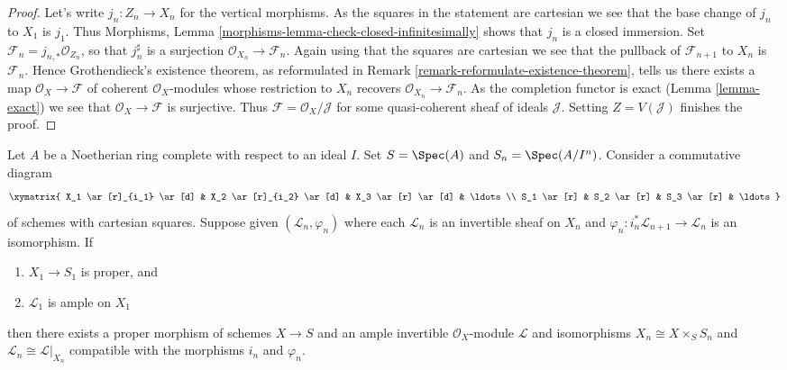 \begin{proof}
Let's write $j_n : Z_n \to X_n$ for the vertical morphisms.
As the squares in the statement are cartesian
we see that the base change of $j_n$ to $X_1$ is $j_1$.
Thus Morphisms, Lemma \ref{morphisms-lemma-check-closed-infinitesimally}
shows that $j_n$ is a closed immersion.
Set $\mathcal{F}_n = j_{n, *}\mathcal{O}_{Z_n}$, so that
$j_n^\sharp$ is a surjection $\mathcal{O}_{X_n} \to \mathcal{F}_n$.
Again using that the squares are cartesian we see that
the pullback of $\mathcal{F}_{n + 1}$ to $X_n$ is $\mathcal{F}_n$.
Hence Grothendieck's existence theorem, as reformulated in
Remark \ref{remark-reformulate-existence-theorem},
tells us there exists a map
$\mathcal{O}_X \to \mathcal{F}$
of coherent $\mathcal{O}_X$-modules whose restriction to
$X_n$ recovers $\mathcal{O}_{X_n} \to \mathcal{F}_n$.
As the completion functor is exact (Lemma \ref{lemma-exact})
we see that $\mathcal{O}_X \to \mathcal{F}$
is surjective. Thus $\mathcal{F} = \mathcal{O}_X/\mathcal{J}$
for some quasi-coherent sheaf of ideals $\mathcal{J}$.
Setting $Z = V(\mathcal{J})$ finishes the proof.
\end{proof}

\begin{theorem}
\label{theorem-algebraization}
Let $A$ be a Noetherian ring complete with respect to an ideal $I$.
Set $S = \Spec(A)$ and $S_n = \Spec(A/I^n)$. Consider a commutative
diagram
$$
\xymatrix{
X_1 \ar[r]_{i_1} \ar[d] & X_2 \ar[r]_{i_2} \ar[d] & X_3 \ar[r] \ar[d] &
\ldots \\
S_1 \ar[r] & S_2 \ar[r] & S_3 \ar[r] & \ldots
}
$$
of schemes with cartesian squares. Suppose given $(\mathcal{L}_n, \varphi_n)$
where each $\mathcal{L}_n$ is an invertible sheaf on $X_n$ and
$\varphi_n : i_n^*\mathcal{L}_{n + 1} \to \mathcal{L}_n$
is an isomorphism. If
\begin{enumerate}
\item $X_1 \to S_1$ is proper, and
\item $\mathcal{L}_1$ is ample on $X_1$
\end{enumerate}
then there exists a proper morphism of schemes $X \to S$
and an ample invertible $\mathcal{O}_X$-module $\mathcal{L}$
and isomorphisms $X_n \cong X \times_S S_n$ and
$\mathcal{L}_n \cong \mathcal{L}|_{X_n}$ compatible with
the morphisms $i_n$ and $\varphi_n$.
\end{theorem}


